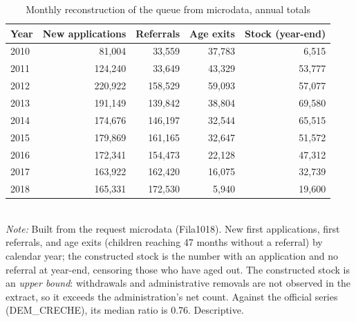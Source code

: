 \begin{table}[htbp]\centering
\caption{Monthly reconstruction of the queue from microdata, annual totals}
\label{tab:T13}
\small
\setlength{\tabcolsep}{5pt}
\begin{tabular}{lrrrr}
\toprule
Year & New applications & Referrals & Age exits & Stock (year-end) \\
\midrule
2010 & 81,004 & 33,559 & 37,783 & 6,515 \\
2011 & 124,240 & 33,649 & 43,329 & 53,777 \\
2012 & 220,922 & 158,529 & 59,093 & 57,077 \\
2013 & 191,149 & 139,842 & 38,804 & 69,580 \\
2014 & 174,676 & 146,197 & 32,544 & 65,515 \\
2015 & 179,869 & 161,165 & 32,647 & 51,572 \\
2016 & 172,341 & 154,473 & 22,128 & 47,312 \\
2017 & 163,922 & 162,420 & 16,075 & 32,739 \\
2018 & 165,331 & 172,530 & 5,940 & 19,600 \\
\bottomrule
\end{tabular}
\\[3pt]{\footnotesize \textit{Note:} Built from the request microdata (Fila1018). New first applications, first referrals, and age exits (children reaching 47 months without a referral) by calendar year; the constructed stock is the number with an application and no referral at year-end, censoring those who have aged out. The constructed stock is an \emph{upper bound}: withdrawals and administrative removals are not observed in the extract, so it exceeds the administration's net count. Against the official series (DEM\_CRECHE), its median ratio is 0.76. Descriptive.}
\end{table}
